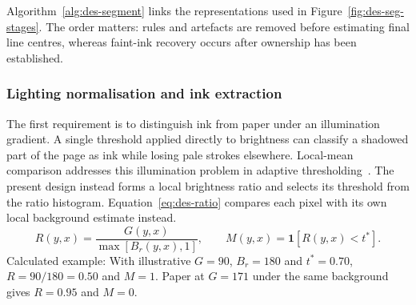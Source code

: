 Algorithm~\ref{alg:des-segment} links the representations used in Figure~\ref{fig:des-seg-stages}. The order matters: rules and artefacts are removed before estimating final line centres, whereas faint-ink recovery occurs after ownership has been established.


\begin{designalgorithm}
\caption{Photographed page to ordered line crops}
\label{alg:des-segment}
\begin{designpseudo}
\end{designpseudo}
\end{designalgorithm}

\subsubsection{Lighting normalisation and ink extraction}
The first requirement is to distinguish ink from paper under an illumination gradient. A single threshold applied directly to brightness can classify a shadowed part of the page as ink while losing pale strokes elsewhere. Local-mean comparison addresses this illumination problem in adaptive thresholding~\cite[PDF pp.~2--3, Secs.~2.2--3]{bradley2007}. The present design instead forms a local brightness ratio and selects its threshold from the ratio histogram. Equation~\ref{eq:des-ratio} compares each pixel with its own local background estimate instead.
\begin{equation}
R(y,x)=\frac{G(y,x)}{\max[B_r(y,x),1]},\qquad
M(y,x)=\mathbf{1}[R(y,x)<t^*].
\label{eq:des-ratio}
\end{equation}
Calculated example: With illustrative $G=90$, $B_r=180$ and $t^*=0.70$, $R=90/180=0.50$ and $M=1$. Paper at $G=171$ under the same background gives $R=0.95$ and $M=0$.


